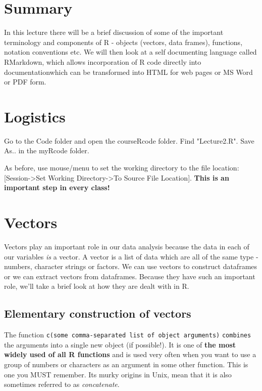 \documentclass[titlepage]{book}\usepackage{knitr}
\begin{document}
\author{Brian Williams $<$\href{mailto:bjw649@gmail.com}%
{bjw649@gmail.com}$>$}

\section{Summary}

In this lecture there will be a brief discussion of some of the important terminology and components of R - objects (vectors, data frames), functions, notation conventions etc.
We will then look at a self documenting language called RMarkdown, which allows incorporation of R code directly  into documentationwhich can be transformed into HTML for web pages or MS Word or PDF form.

\section{Logistics}

Go to the Code folder and open the courseRcode folder.  Find "Lecture2.R". Save As.. in the myRcode folder.

As before, use mouse/menu to set the working directory to the file location: [Session->Set Working Directory->To Source File Location]. \textbf{This is an important step in every class!}


\section{Vectors}\label{vectors}

Vectors play an important role in our data analysis because the data in each of our variables \textsl{is} a vector.  A vector is a list of data which are all of the same type - numbers, character strings or factors.  We can use vectors to construct dataframes or we can extract vectors from dataframes.
Because they have such an important role, we'll take a brief look at how they are dealt with in R.


\subsection{Elementary construction of vectors}
The function \texttt{c(some comma-separated list of object arguments)} \texttt{combines} the arguments into a single new object (if possible!). It is one of \textbf{the most widely used of all R functions} and is used very often when you want to use a group of numbers or characters as an argument in some other function. This is one you MUST remember. Its murky origins in Unix, mean that it is also sometimes referred to as \emph{concatenate}.
\end{document}

